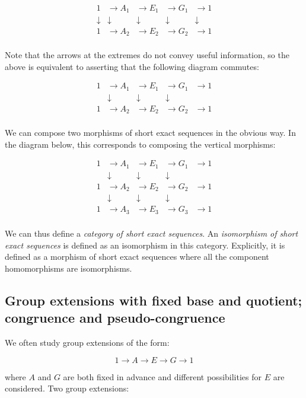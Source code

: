 \documentclass{ucetd}
\begin{document}
$$\begin{array}{rrrrr}
  1 & \to A_1 & \to E_1 & \to G_1 & \to 1 \\
  \downarrow & \downarrow & \downarrow & \downarrow & \downarrow\\
  1 & \to A_2 & \to E_2 & \to G_2 & \to 1 \\
\end{array}$$

Note that the arrows at the extremes do not convey useful information,
so the above is equivalent to asserting that the following diagram
commutes:

$$\begin{array}{rrrrr}
  1 & \to A_1 & \to E_1 & \to G_1 & \to 1 \\
  & \downarrow & \downarrow & \downarrow &\\
  1 & \to A_2 & \to E_2 & \to G_2 & \to 1 \\
\end{array}$$

We can compose two morphisms of short exact sequences in the obvious
way. In the diagram below, this corresponds to composing the vertical
morphisms:

$$\begin{array}{rrrrr}
  1 & \to A_1 & \to E_1 & \to G_1 & \to 1 \\
  & \downarrow & \downarrow & \downarrow & \\
  1 & \to A_2 & \to E_2 & \to G_2 & \to 1 \\
  & \downarrow & \downarrow & \downarrow & \\
  1 & \to A_3 & \to E_3 & \to G_3 & \to 1 \\
\end{array}$$

We can thus define a {\em category of short exact sequences}. An
{\em isomorphism of short exact sequences} is defined as an
isomorphism in this category. Explicitly, it is defined as a morphism
of short exact sequences where all the component homomorphisms are
isomorphisms.

\subsection{Group extensions with fixed base and quotient; congruence and pseudo-congruence}

We often study group extensions of the form:

$$1 \to A \to E \to G \to 1$$

where $A$ and $G$ are both fixed in advance and different
possibilities for $E$ are considered. Two group extensions:
\end{document}
